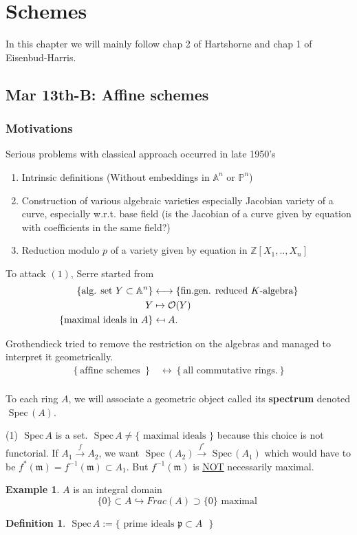 \documentclass[11pt]{article}
\theoremstyle{definition}
\newtheorem{dfn}[thm]{Definition}
\newtheorem{ex}[thm]{Example}
\newcommand{\spec}{\text{ Spec}\,}
\newcommand{\affn}{\mathbb A}
\newcommand{\proj}{\mathbb P}
\newcommand{\intg}{\mathbb Z}
\newcommand{\scm}{{\mathfrak m}}
\newcommand{\scp}{{\mathfrak p}}
\newcommand{\calo}{{\cal O}}
\newcommand{\lrta}{\longrightarrow}
\newcommand{\llrta}{\longleftrightarrow}
\newcommand{\inj}{\hookrightarrow}
\begin{document}
\section{Schemes}
In this chapter we will mainly follow chap 2 of Hartshorne and chap 1 of Eisenbud-Harris.
\subsection{Mar 13th-B: Affine schemes}
\subsubsection{Motivations}
Serious problems with classical approach occurred in late 1950's
\begin{enumerate}[label=(\arabic*)]
\item Intrinsic definitions (Without embeddings in $\affn^n$ or $\proj^n$)
\item Construction of various algebraic varieties especially Jacobian variety of a curve, especially w.r.t. base field (is the Jacobian of a curve given by equation with coefficients in the same field?)
\item Reduction modulo $p$ of a variety given by equation in $\intg[X_1,..,X_n]$
\end{enumerate}
To attack $(1)$, Serre started from
$$
\begin{aligned}
\left\{\text{alg. set }Y\subset \affn^n \right\}&\llrta \left\{\text{fin.gen. reduced $K$-algebra}\right\}\\
Y&\mapsto \calo(Y)\\
\{\text{maximal ideals in $A$}\}&\mapsfrom A.
\end{aligned}
$$

Grothendieck tried to remove the restriction on the algebras and managed to interpret it geometrically.
$$
\begin{aligned}
\left\{\text{affine schemes }\right\}&\llrta \left\{\text{all commutative rings.}\right\}\\
\end{aligned}
$$

To each ring $A$, we will associate a geometric object called its \textbf{spectrum} denoted $\spec(A)$.

(1) $\spec A$ is a set. 
$\spec A\neq \{\text{ maximal ideals }\}$ because this choice is not functorial. If $A_1\overset{f}{\lrta} A_2$, we want $\spec(A_2)\overset{f^*}{\lrta}\spec(A_1)$ which would have to be $f^*(\scm)=f^{-1}(\scm)\subset A_1$. But $f^{-1}(\scm)$ is \underline{NOT} necessarily maximal.
\begin{ex}
$A$ is an integral domain
$$
\{0\}\subset A\inj Frac(A)\supset\{0\}\text{ maximal }
$$
\end{ex}
\begin{dfn}
$\spec A:=\{\text{ prime ideals $\scp\subset A$ }\}$
\end{dfn}
\end{document}
